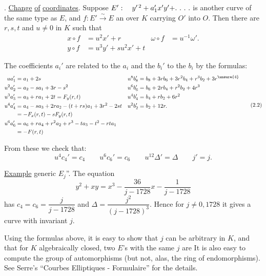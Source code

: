 \begingroup
\makeatletter\tagsleft@true{}. \uline{Change} \uline{of} \uline{coordinates}. Suppose $E':\quad y^{\prime\,2}+a_1'x'y'+\ldotp\,\ldotp\,\ldotp\,\ldotp$ is another curve of the same type as $E$, and $f:E'\overset{\sim}{\longrightarrow}E$ an  over $K$ carrying $O'$ into $O$. Then there are $r,s,t$ and $u\ne0$ in $K$ such that
\[
\begin{aligned}
x\circ f&=u^2x'+r & \omega\circ f&=u^{-1}\omega'.\\
y\circ f&=u^3y'+su^2x'+t
\end{aligned}
\tag*{(2.1)}
\]

The coefficients $a_i'$ are related to the $a_i$  and the $b_i'$ to the $b_i$ by the formulas:
\begingroup\scriptsize
\[
\begin{aligned}
ua_1'&=a_1+2s & u^8b_8'&=b_8+3rb_6+3r^2b_4+r^3b_2+3r^{\unsure{4}}\\
u^2a_2'&=a_2-sa_1+3r-s^2 & u^6b_6'&=b_6+2rb_4+r^2b_2+4r^3\\
u^3a_3'&=a_3+ra_1+2t=F_y(r,t) & u^4b_4'&=b_4+rb_2+6r^2\\
u^4a_4'&=a_4-sa_3+2ra_2-(t+rs)a_1+3r^2-2st
 & u^2b_2'&=b_2+12r.\\
 &= -F_x(r,t)-sF_y(r,t)\\
u^6a_6'&=a_6+ra_4+r^2a_2+r^3-ta_3-t^2-rta_1\\
 &= -F(r,t)
\end{aligned}
\tag*{(2.2)}
\]
\endgroup

From these we check that:
\[
u^4c_4'=c_4\qquad u^6c_6'=c_6\qquad
u^{12}\Delta'=\Delta\qquad j'=j.
\tag*{(2.3)}
\]

\uline{Example} generic $E_j$''. The equation
\[
y^2+xy=x^3-\frac{36}{j-1728}x-\frac{1}{j-1728}
\tag*{(2.4)}
\]
has $c_4=c_6=\dfrac{j}{j-1728}$ and $\Delta=\dfrac{j^2}{(j-1728)^3}$. Hence for $j\ne0,1728$ it gives a curve with invariant $j$.

Using the formulas above, it is easy to show that $j$ can be arbitrary in $K$, and that for $K$ algebraically closed, two $E$'s with the same $j$ are  It is also easy to compute the group of automorphisms (but not, alas, the ring of endomorphisms). See Serre's ``Courbes Elliptiques - Formulaire'' for the details.
\endgroup

